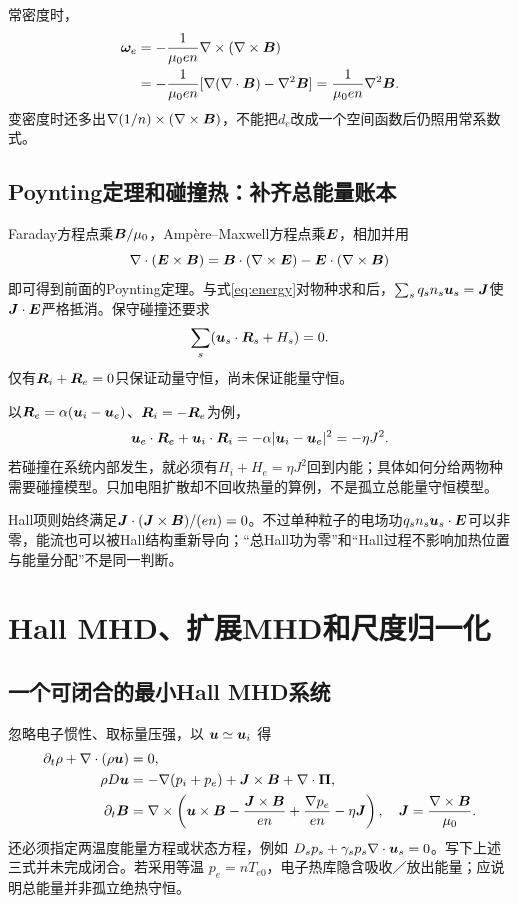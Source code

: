 \documentclass[UTF8,a4paper,11pt,openany,fontset=fandol]{ctexbook}
\begin{document}
常密度时，
\begin{align}
 \bm{\omega}_e
 &=-{1\over\mu_0en}\nabla\times(\nabla\times\bm{B})\\
 &=-{1\over\mu_0en}[\nabla(\nabla\cdot\bm{B})-\nabla^2\bm{B}]
 ={1\over\mu_0en}\nabla^2\bm{B}.
\end{align}
变密度时还多出$\nabla(1/n)\times(\nabla\times\bm{B})$，不能把$d_e$改成一个空间函数后仍照用常系数式。

\subsection{Poynting定理和碰撞热：补齐总能量账本}
Faraday方程点乘$\bm{B}/\mu_0$，Ampère--Maxwell方程点乘$\bm{E}$，相加并用
\begin{equation}
 \nabla\cdot(\bm{E}\times\bm{B})=\bm{B}\cdot(\nabla\times\bm{E})-\bm{E}\cdot(\nabla\times\bm{B})
\end{equation}
即可得到前面的Poynting定理。与式\eqref{eq:energy}对物种求和后，$\sum_s q_sn_s\bm{u}_s=\bm{J}$使$\bm{J}\cdot\bm{E}$严格抵消。保守碰撞还要求
\begin{equation}
 \sum_s(\bm{u}_s\cdot\bm{R}_s+H_s)=0.
\end{equation}
仅有$\bm{R}_i+\bm{R}_e=0$只保证动量守恒，尚未保证能量守恒。

以$\bm{R}_e=\alpha(\bm{u}_i-\bm{u}_e)$、$\bm{R}_i=-\bm{R}_e$为例，
\begin{equation}
 \bm{u}_e\cdot\bm{R}_e+\bm{u}_i\cdot\bm{R}_i
 =-\alpha|\bm{u}_i-\bm{u}_e|^2=-\eta J^2.
\end{equation}
若碰撞在系统内部发生，就必须有$H_i+H_e=\eta J^2$回到内能；具体如何分给两物种需要碰撞模型。只加电阻扩散却不回收热量的算例，不是孤立总能量守恒模型。

Hall项则始终满足$\bm{J}\cdot(\bm{J}\times\bm{B})/(en)=0$。不过单种粒子的电场功$q_sn_s\bm{u}_s\cdot\bm{E}$可以非零，能流也可以被Hall结构重新导向；“总Hall功为零”和“Hall过程不影响加热位置与能量分配”不是同一判断。


\section{Hall MHD、扩展MHD和尺度归一化}
\subsection{一个可闭合的最小Hall MHD系统}
忽略电子惯性、取标量压强，以 $\bm{u}\simeq\bm{u}_i$ 得
\begin{align}
\partial_t\rho+\nabla\cdot(\rho\bm{u})&=0,\\
\rho D\bm{u}&=-\nabla(p_i+p_e)+\bm{J}\times\bm{B}+\nabla\cdot\bm{\Pi},\\
\partial_t\bm{B}&=\nabla\times\left(\bm{u}\times\bm{B}-{\bm{J}\times\bm{B}\over en}+{\nabla p_e\over en}-\eta\bm{J}\right),\quad\bm{J}={\nabla\times\bm{B}\over\mu_0}.\label{eq:hallinduction}
\end{align}
还必须指定两温度能量方程或状态方程，例如 $D_sp_s+\gamma_sp_s\nabla\cdot\bm{u}_s=0$。写下上述三式并未完成闭合。若采用等温 $p_e=nT_{e0}$，电子热库隐含吸收／放出能量；应说明总能量并非孤立绝热守恒。
\end{document}
